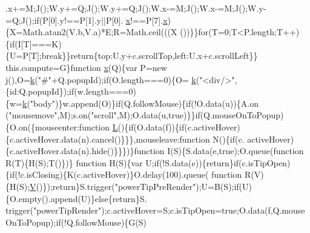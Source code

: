 \begin{DoxyCode}
      .x+=M;J();W.y+=Q;J();W.y+=Q;J();W.x-=M;J();W.x-=M;J();W.y-=Q;J();\textcolor{keywordflow}{if}(P[0].y!==P[1].y||P[0].
      \hyperlink{jquery_8js_a4c3eadaa5164016d2c340d495fc6e55e}{x}!==P[7].\hyperlink{jquery_8js_a4c3eadaa5164016d2c340d495fc6e55e}{x})\{X=Math.atan2(V.b,V.a)*E;R=Math.ceil(((X%
      ())\}\}\textcolor{keywordflow}{for}(T=0;T<P.length;T++)\{\textcolor{keywordflow}{if}(I[T]===K)\{U=P[T];\textcolor{keywordflow}{break}\}\}\textcolor{keywordflow}{return}\{top:U.y+c.scrollTop,left:U.x+c.scrollLeft\}\}
      this.compute=G\}\textcolor{keyword}{function} \hyperlink{jquery_8js_a4c3eadaa5164016d2c340d495fc6e55e}{x}(Q)\{var P=\textcolor{keyword}{new} j(),O=\hyperlink{jquery_8js_ab26645c014aa005ecedef329ecf58c99}{k}(\textcolor{stringliteral}{"#"}+Q.popupId);\textcolor{keywordflow}{if}(O.length===0)\{O=
      \hyperlink{jquery_8js_ab26645c014aa005ecedef329ecf58c99}{k}(\textcolor{stringliteral}{"<div/>"},\{\textcolor{keywordtype}{id}:Q.popupId\});\textcolor{keywordflow}{if}(w.length===0)\{w=\hyperlink{jquery_8js_ab26645c014aa005ecedef329ecf58c99}{k}(\textcolor{stringliteral}{"body"})\}w.append(O)\}\textcolor{keywordflow}{if}(Q.followMouse)\{\textcolor{keywordflow}{if}(!O.data(u))\{A.on
      (\textcolor{stringliteral}{"mousemove"},M);s.on(\textcolor{stringliteral}{"scroll"},M);O.data(u,\textcolor{keyword}{true})\}\}\textcolor{keywordflow}{if}(Q.mouseOnToPopup)\{O.on(\{mouseenter:\textcolor{keyword}{function} 
      \hyperlink{jquery_8js_a38ee4c0b5f4fe2a18d0c783af540d253}{L}()\{\textcolor{keywordflow}{if}(O.data(f))\{\textcolor{keywordflow}{if}(c.activeHover)\{c.activeHover.data(n).cancel()\}\}\},mouseleave:\textcolor{keyword}{function} N()\{\textcolor{keywordflow}{if}(c.
      activeHover)\{c.activeHover.data(n).hide()\}\}\})\}\textcolor{keyword}{function} I(S)\{S.data(e,\textcolor{keyword}{true});O.queue(\textcolor{keyword}{function} R(T)\{H(S);T()\})\}\textcolor{keyword}{
      function} H(S)\{var U;\textcolor{keywordflow}{if}(!S.data(e))\{\textcolor{keywordflow}{return}\}\textcolor{keywordflow}{if}(c.isTipOpen)\{\textcolor{keywordflow}{if}(!c.isClosing)\{K(c.activeHover)\}O.delay(100).queue(\textcolor{keyword}{
      function} R(V)\{H(S);\hyperlink{jquery_8js_a8b88915d3d3a06e98248a89807b077fa}{V}()\});\textcolor{keywordflow}{return}\}S.trigger(\textcolor{stringliteral}{"powerTipPreRender"});U=B(S);\textcolor{keywordflow}{if}(U)\{O.empty().append(U)\}\textcolor{keywordflow}{else}\{\textcolor{keywordflow}{return}\}S.
      trigger(\textcolor{stringliteral}{"powerTipRender"});c.activeHover=S;c.isTipOpen=\textcolor{keyword}{true};O.data(f,Q.mouseOnToPopup);\textcolor{keywordflow}{if}(!Q.followMouse)\{G(S)

\end{DoxyCode}
